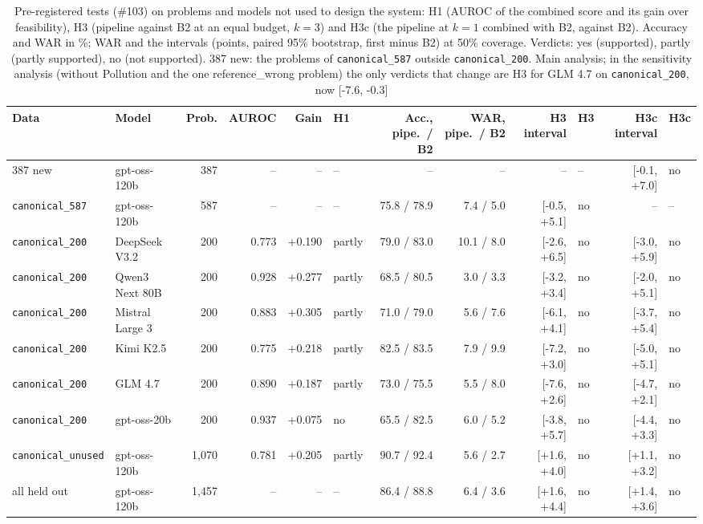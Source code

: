 \begin{table}[t]
\centering
\caption{Pre-registered tests (\#103) on problems and models not used to design the system: H1 (AUROC of the combined score and its gain over feasibility), H3 (pipeline against B2 at an equal budget, $k=3$) and H3c (the pipeline at $k=1$ combined with B2, against B2). Accuracy and WAR in \%; WAR and the intervals (points, paired 95\% bootstrap, first minus B2) at 50\% coverage. Verdicts: yes (supported), partly (partly supported), no (not supported). 387 new: the problems of \texttt{canonical\_587} outside \texttt{canonical\_200}. Main analysis; in the sensitivity analysis (without Pollution and the one reference\_wrong problem) the only verdicts that change are H3 for GLM 4.7 on \texttt{canonical\_200}, now [-7.6, -0.3]}
\label{tab:preregistered}
\footnotesize
\setlength{\tabcolsep}{3pt}
\begin{tabular}{@{}llrrrlrrrlrl@{}}
\toprule
Data & Model & Prob. & AUROC & Gain & H1 & Acc., pipe.\ / B2 & WAR, pipe.\ / B2 & H3 interval & H3 & H3c interval & H3c \\
\midrule
387 new & gpt-oss-120b & 387 & -- & -- & -- & -- & -- & -- & -- & [-0.1, +7.0] & no \\
\texttt{canonical\_587} & gpt-oss-120b & 587 & -- & -- & -- & 75.8 / 78.9 & 7.4 / 5.0 & [-0.5, +5.1] & no & -- & -- \\
\texttt{canonical\_200} & DeepSeek V3.2 & 200 & 0.773 & +0.190 & partly & 79.0 / 83.0 & 10.1 / 8.0 & [-2.6, +6.5] & no & [-3.0, +5.9] & no \\
\texttt{canonical\_200} & Qwen3 Next 80B & 200 & 0.928 & +0.277 & partly & 68.5 / 80.5 & 3.0 / 3.3 & [-3.2, +3.4] & no & [-2.0, +5.1] & no \\
\texttt{canonical\_200} & Mistral Large 3 & 200 & 0.883 & +0.305 & partly & 71.0 / 79.0 & 5.6 / 7.6 & [-6.1, +4.1] & no & [-3.7, +5.4] & no \\
\texttt{canonical\_200} & Kimi K2.5 & 200 & 0.775 & +0.218 & partly & 82.5 / 83.5 & 7.9 / 9.9 & [-7.2, +3.0] & no & [-5.0, +5.1] & no \\
\texttt{canonical\_200} & GLM 4.7 & 200 & 0.890 & +0.187 & partly & 73.0 / 75.5 & 5.5 / 8.0 & [-7.6, +2.6] & no & [-4.7, +2.1] & no \\
\texttt{canonical\_200} & gpt-oss-20b & 200 & 0.937 & +0.075 & no & 65.5 / 82.5 & 6.0 / 5.2 & [-3.8, +5.7] & no & [-4.4, +3.3] & no \\
\texttt{canonical\_unused} & gpt-oss-120b & 1,070 & 0.781 & +0.205 & partly & 90.7 / 92.4 & 5.6 / 2.7 & [+1.6, +4.0] & no & [+1.1, +3.2] & no \\
all held out & gpt-oss-120b & 1,457 & -- & -- & -- & 86.4 / 88.8 & 6.4 / 3.6 & [+1.6, +4.4] & no & [+1.4, +3.6] & no \\
\bottomrule
\end{tabular}
\end{table}
